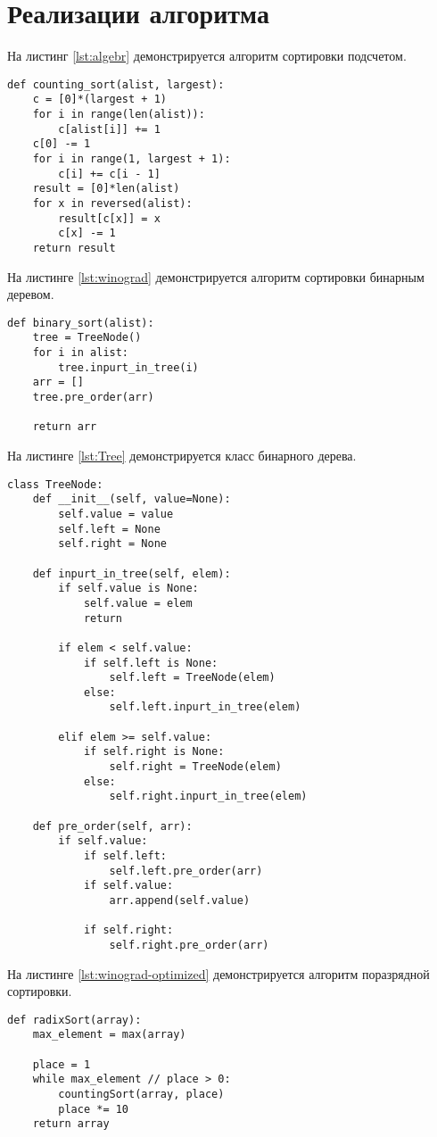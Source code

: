 \section{Реализации алгоритма}
На листинг \ref{lst:algebr} демонстрируется алгоритм сортировки подсчетом. 


\captionsetup{singlelinecheck = false, justification=raggedright}
\begin{lstlisting}[label=lst:algebr,caption=Алгоритм сортировки подсчетомя]
def counting_sort(alist, largest):
	c = [0]*(largest + 1)
	for i in range(len(alist)):
		c[alist[i]] += 1
	c[0] -= 1
	for i in range(1, largest + 1):
		c[i] += c[i - 1]
	result = [0]*len(alist)
	for x in reversed(alist):
		result[c[x]] = x
		c[x] -= 1
	return result
\end{lstlisting}


На листинге \ref{lst:winograd} демонстрируется алгоритм сортировки бинарным деревом.

\begin{lstlisting}[label=lst:winograd,caption=Алгоритм сортировки бинарным дерево]
def binary_sort(alist):
	tree = TreeNode()
	for i in alist:
		tree.inpurt_in_tree(i)
	arr = []
	tree.pre_order(arr)
	
	return arr
\end{lstlisting}	

На листинге \ref{lst:Tree} демонстрируется класс бинарного дерева.

\begin{lstlisting}[label=lst:Tree,caption=Класс бинарного дерев]
	class TreeNode:
	def __init__(self, value=None):
		self.value = value
		self.left = None
		self.right = None
	
	def inpurt_in_tree(self, elem):
		if self.value is None:
			self.value = elem
			return
		
		if elem < self.value:
			if self.left is None:
				self.left = TreeNode(elem)
			else:
				self.left.inpurt_in_tree(elem)
			
		elif elem >= self.value:
			if self.right is None:
				self.right = TreeNode(elem)
			else:
				self.right.inpurt_in_tree(elem)
	
	def pre_order(self, arr):
		if self.value:
			if self.left:
				self.left.pre_order(arr)
			if self.value: 
				arr.append(self.value)
			
			if self.right:
				self.right.pre_order(arr)
\end{lstlisting}	

\newpage
На листинге \ref{lst:winograd-optimized} демонстрируется алгоритм поразрядной сортировки.
\begin{lstlisting}[label=lst:winograd-optimized,caption=Алгоритм поразрядной сортировки]
	def radixSort(array):
    max_element = max(array)

    place = 1
    while max_element // place > 0:
        countingSort(array, place)
        place *= 10
    return array
    
\end{lstlisting}	

